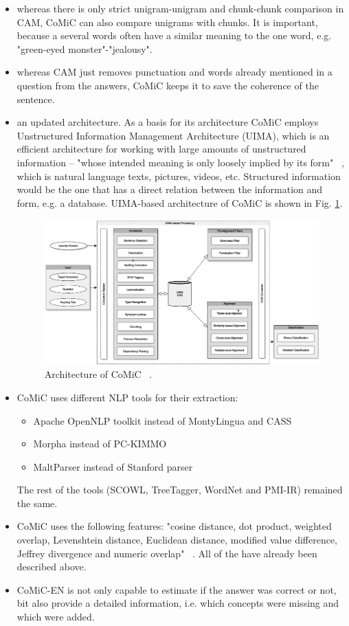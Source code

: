 \begin{itemize}
\item whereas there is only strict unigram-unigram and chunk-chunk comparison in CAM, CoMiC can also compare unigrams with chunks. It is important, because a several words often have a similar meaning to the one word, e.g. "green-eyed monster"-"jealousy".
\item whereas CAM just removes punctuation and words already mentioned in a question from the answers, CoMiC keeps it to save the coherence of the sentence.
\item an updated architecture.  As a basis for its architecture CoMiC employs  Unstructured Information Management Architecture (UIMA), which is an efficient architecture for working with large amounts of unstructured information -- "whose intended meaning is only loosely implied by its form" ~\cite{UIMA}, which is natural language texts, pictures, videos, etc. Structured information would be the one that has a direct relation between the information and form, e.g. a database. UIMA-based architecture of CoMiC is shown in Fig. \ref{fig:UIMA}.

\begin{figure}[h!]
  \centering
  \includegraphics[width=\textwidth]{img/UIMA}
    \caption{ Architecture of CoMiC ~\cite{CoMiC-EN}. }\label{fig:UIMA}
\end{figure}

\item CoMiC uses different NLP tools for their extraction:
\begin{itemize}
\item Apache OpenNLP toolkit instead of MontyLingua and CASS
\item Morpha instead of PC-KIMMO
\item MaltParser instead of Stanford parser
\end{itemize}
The rest of the tools (SCOWL, TreeTagger, WordNet and PMI-IR) remained the same.
\item CoMiC uses the following features: "cosine distance, dot product, weighted overlap, Levenshtein distance, Euclidean distance, modified value difference, Jeffrey divergence and numeric overlap" ~\cite{CoMiC-EN}. All of the have already been described above.
\item CoMiC-EN is not only capable to estimate if the answer was correct or not, bit also provide a detailed information, i.e. which concepts were missing and which were added.
\end{itemize} 

